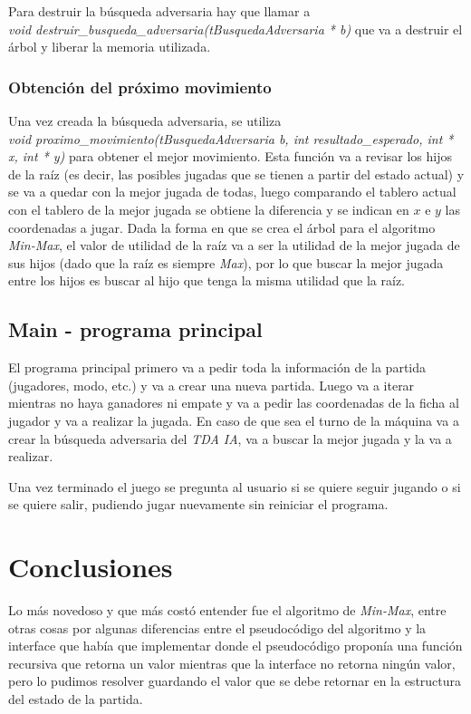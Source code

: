 \documentclass[12pt,a4paper]{article}
\begin{document}
Para destruir la b\'usqueda adversaria hay que llamar a \\\emph{void destruir\_busqueda\_adversaria(tBusquedaAdversaria * b)} que va a destruir el \'arbol y liberar la memoria utilizada.

\subsubsection{Obtenci\'on del pr\'oximo movimiento}
Una vez creada la b\'usqueda adversaria, se utiliza \\\emph{void proximo\_movimiento(tBusquedaAdversaria b, int resultado\_esperado, int * x, int * y)} para obtener el mejor movimiento. Esta funci\'on va a revisar los hijos de la ra\'iz (es decir, las posibles jugadas que se tienen a partir del estado actual) y se va a quedar con la mejor jugada de todas, luego comparando el tablero actual con el tablero de la mejor jugada se obtiene la diferencia y se indican en $x$ e $y$ las coordenadas a jugar. Dada la forma en que se crea el \'arbol para el algoritmo \emph{Min-Max}, el valor de utilidad de la ra\'iz va a ser la utilidad de la mejor jugada de sus hijos (dado que la ra\'iz es siempre \emph{Max}), por lo que buscar la mejor jugada entre los hijos es buscar al hijo que tenga la misma utilidad que la ra\'iz.

\subsection{Main - programa principal}
El programa principal primero va a pedir toda la informaci\'on de la partida (jugadores, modo, etc.) y va a crear una nueva partida. Luego va a iterar mientras no haya ganadores ni empate y va a pedir las coordenadas de la ficha al jugador y va a realizar la jugada. En caso de que sea el turno de la m\'aquina va a crear la b\'usqueda adversaria del \emph{TDA IA}, va a buscar la mejor jugada y la va a realizar.

Una vez terminado el juego se pregunta al usuario si se quiere seguir jugando o si se quiere salir, pudiendo jugar nuevamente sin reiniciar el programa.

\section{Conclusiones}
Lo m\'as novedoso y que m\'as cost\'o entender fue el algoritmo de \emph{Min-Max}, entre otras cosas por algunas diferencias entre el pseudoc\'odigo del algoritmo y la interface que hab\'ia que implementar donde el pseudoc\'odigo propon\'ia una funci\'on recursiva que retorna un valor mientras que la interface no retorna ning\'un valor, pero lo pudimos resolver guardando el valor que se debe retornar en la estructura del estado de la partida.
\end{document}
